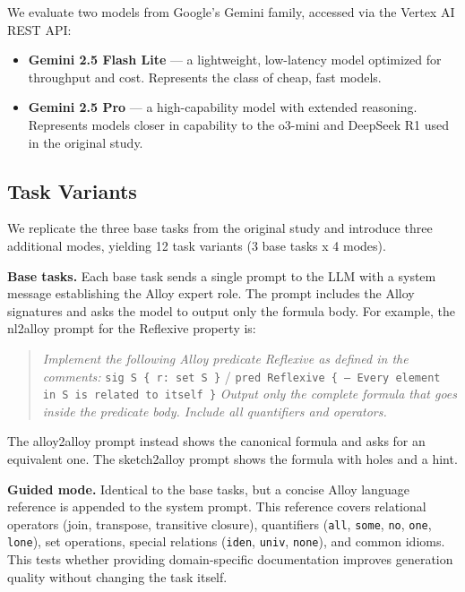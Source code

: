 \documentclass[11pt]{article}
\begin{document}
We evaluate two models from Google's Gemini family, accessed via the Vertex AI REST API:
\begin{itemize}
  \item \textbf{Gemini 2.5 Flash Lite} --- a lightweight, low-latency model optimized for throughput and cost. Represents the class of cheap, fast models.
  \item \textbf{Gemini 2.5 Pro} --- a high-capability model with extended reasoning. Represents models closer in capability to the o3-mini and DeepSeek R1 used in the original study.
\end{itemize}

\subsection{Task Variants}

We replicate the three base tasks from the original study and introduce three additional modes, yielding 12 task variants (3 base tasks x 4 modes).

\textbf{Base tasks.} Each base task sends a single prompt to the LLM with a system message establishing the Alloy expert role. The prompt includes the Alloy signatures and asks the model to output only the formula body. For example, the nl2alloy prompt for the Reflexive property is:

\begin{quote}
\emph{Implement the following Alloy predicate Reflexive as defined in the comments:}
\texttt{sig S \{ r: set S \}} / \texttt{pred Reflexive \{ -- Every element in S is related to itself \}}
\emph{Output only the complete formula that goes inside the predicate body. Include all quantifiers and operators.}
\end{quote}

The alloy2alloy prompt instead shows the canonical formula and asks for an equivalent one. The sketch2alloy prompt shows the formula with holes and a hint.

\textbf{Guided mode.} Identical to the base tasks, but a concise Alloy language reference is appended to the system prompt. This reference covers relational operators (join, transpose, transitive closure), quantifiers (\texttt{all}, \texttt{some}, \texttt{no}, \texttt{one}, \texttt{lone}), set operations, special relations (\texttt{iden}, \texttt{univ}, \texttt{none}), and common idioms. This tests whether providing domain-specific documentation improves generation quality without changing the task itself.
\end{document}
